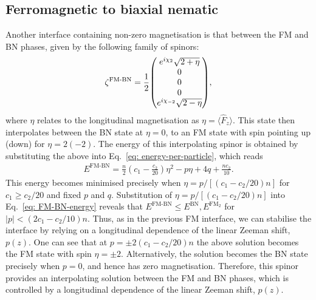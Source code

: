 \subsection{Ferromagnetic to biaxial nematic}
Another interface containing non-zero magnetisation is that between the FM and
BN phases, given by the following family of spinors:
\begin{align}\label{eq: FM-BN-interpolating-spinor}
    \zeta^\text{FM-BN} = \frac{1}{2}\mqty(
    e^{i\chi_2} \sqrt{2 + \eta} \\
    0 \\
    0 \\
    0 \\
    e^{i\chi_{-2}} \sqrt{2 - \eta}),
\end{align}
where \(\eta \) relates to the longitudinal magnetisation as \(\eta =
\langle\hat{F}_z\rangle\).
This state then interpolates between the BN state at \(\eta = 0\), to an FM
state with spin pointing up (down) for \(\eta = 2 (-2)\).
The energy of this interpolating spinor is obtained by substituting the above
into Eq.~\eqref{eq: energy-per-particle}, which reads
\begin{align}\label{eq: FM-BN-energy}
    E^\text{FM-BN} = \frac{n}{2}\left(c_1-\frac{c_2}{20}\right)\eta^2
    - p \eta + 4q + \frac{nc_2}{10}.
\end{align}
This energy becomes minimised precisely when \(\eta = p / [(c_1-c_2/20)n]\) for
\(c_1 \geq c_2/20\) and fixed \(p\) and \(q\).
Substitution of \(\eta = p / [(c_1-c_2/20)n]\) into Eq.~\eqref{eq: FM-BN-energy}
reveals that \(E^\text{FM-BN} \leq E^\text{BN},
E^{\text{FM}_2}\) for \(|p| < (2c_1-c_2/10)n\).
Thus, as in the previous FM interface, we can stabilise the interface by relying
on a longitudinal dependence of the linear Zeeman shift, \(p(z)\).
One can see that at \(p = \pm 2(c_1-c_2/20)n\) the above solution becomes
the FM state with spin \(\eta = \pm 2\).
Alternatively, the solution becomes the BN state precisely when \(p=0\), and
hence has zero magnetisation.
Therefore, this spinor provides an interpolating solution between the
FM and BN phases, which is controlled by a longitudinal dependence of
the linear Zeeman shift, \(p(z)\).

